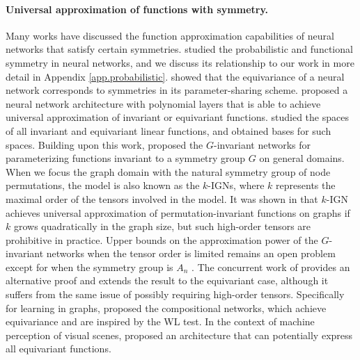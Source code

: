 \documentclass{article}
\begin{document}
\paragraph{Universal approximation of functions with symmetry.} Many works have discussed the function approximation capabilities of neural networks that satisfy certain symmetries.
\cite{bloemreddy2019probabilistic} studied the probabilistic and functional symmetry in neural networks, and we discuss its relationship to our work in more detail in Appendix \ref{app.probabilistic}. \cite{ravanbakhsh2017sharing} showed that the equivariance of a neural network corresponds to symmetries in its parameter-sharing scheme. \cite{yarotsky2018universal} proposed a neural network architecture with polynomial layers that is able to achieve universal approximation of invariant or equivariant functions.  
\cite{maron2018invariant} studied the spaces of all invariant and equivariant linear functions, and obtained bases for such spaces. Building upon this work, \cite{maron2019universality} proposed the $G$-invariant networks for parameterizing functions invariant to a symmetry group $G$ on general domains. When we focus the graph domain with the natural symmetry group of node permutations, the model is also known as the $k$-IGNs, where $k$ represents the maximal order of the tensors involved in the model. It was shown in \cite{maron2019universality} that $k$-IGN achieves universal approximation of permutation-invariant functions on graphs if $k$ grows quadratically in the graph size, but such high-order tensors are prohibitive in practice. Upper bounds on the approximation power of the $G$-invariant networks when the tensor order is limited remains an open problem except for when the symmetry group is $A_n$ \cite{maron2019universality}. The concurrent work of \cite{keriven2019universal} provides an alternative proof and extends the result to the equivariant case, although it suffers from the same issue of possibly requiring high-order tensors. Specifically for learning in graphs, \cite{kondor2018covariant} proposed the compositional networks, which achieve equivariance and are inspired by the WL test. In the context of machine perception of visual scenes, \cite{herzig2018mapping} proposed an architecture that can potentially express all equivariant functions.
\end{document}
